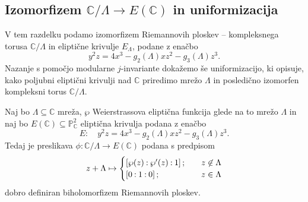 \documentclass[mat1]{fmfdelo}
\numberwithin{equation}{section}
\newcommand{\C}{\mathbb C}
\newcommand{\Lattice}{\mathscr{L}}
\newcommand{\CM}{\mathbb C ^*}
\newcommand{\PC}{\mathbb{P}^2_\C}
\newcommand{\oio}{\pcoor{0: 1 : 0}}
\newcommand{\om}{\omega}
\newcommand{\inv}{^{-1}}
\newcommand{\torus}{\C/\Lambda}
\newcommand{\htp}{\simeq}
\newcommand{\pcoor}[1]{%
\begingroup\lccode`~=`: \lowercase{\endgroup
\edef~}{\mathbin{\mathchar\the\mathcode`:}\nobreak}%
\left[%
\begingroup
\mathcode`:=\string"8000
#1%
\endgroup
\right]%
}
\renewcommand\Im{\operatorname{Im}}%
\theoremstyle{definition}
\begin{document}



\subsection{Izomorfizem \texorpdfstring{$\C/\Lambda \to E(\C)$ in uniformizacija}{}} 

V tem razdelku podamo izomorfizem Riemannovih ploskev -- kompleksnega torusa $\torus$ in eliptične krivulje $E_\Lambda$, podane z enačbo
\[
    y^2z = 4x^3 - g_2(\Lambda)xz^2 - g_3(\Lambda)z^3.
\]
Nazanje s pomočjo modularne $j$-invariante dokažemo še uniformizacijo, ki opisuje, kako poljubni eliptični krivulji nad $\C$ priredimo mrežo $\Lambda$ in posledično izomorfen kompleksni torus $\torus$.

\begin{izrek}
    \label{izomorfizem torusa in krivulje}
    Naj bo $\Lambda \subseteq \C$ mreža, $\wp$ Weierstrassova eliptična funkcija glede na to mrežo $\Lambda$ in naj bo $E(\C)\subseteq \PC$ eliptična krivulja podana z enačbo
    \[
        E: \quad y^2z = 4x^3 - g_2(\Lambda)xz^2 - g_3(\Lambda)z^3.  
    \]
    Tedaj je preslikava $\phi : \torus \to E(\C)$ podana s predpisom
    \[
        z + \Lambda \mapsto 
        \begin{cases}
            \pcoor{\wp(z) : \wp'(z) : 1}; \quad &z \not\in \Lambda \\
            \oio; \quad &z \in \Lambda
        \end{cases}  
    \]
    dobro definiran biholomorfizem Riemannovih ploskev.
\end{izrek}
\end{document}
